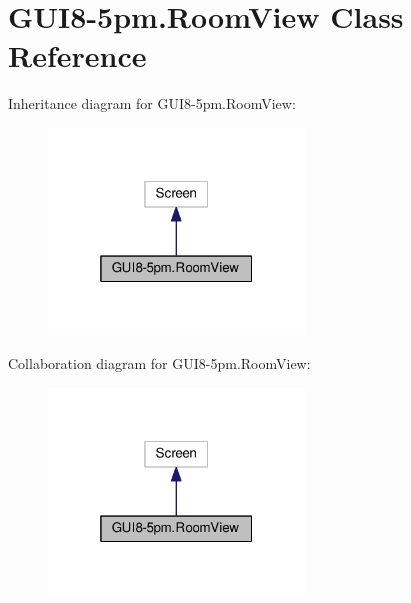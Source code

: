 \hypertarget{classGUI8-5pm_1_1RoomView}{}\section{G\+U\+I8-\/5pm.Room\+View Class Reference}
\label{classGUI8-5pm_1_1RoomView}


Inheritance diagram for G\+U\+I8-\/5pm.Room\+View\+:\nopagebreak
\begin{figure}[H]
\begin{center}
\leavevmode
\includegraphics[width=193pt]{classGUI8-5pm_1_1RoomView__inherit__graph}
\end{center}
\end{figure}


Collaboration diagram for G\+U\+I8-\/5pm.Room\+View\+:\nopagebreak
\begin{figure}[H]
\begin{center}
\leavevmode
\includegraphics[width=193pt]{classGUI8-5pm_1_1RoomView__coll__graph}
\end{center}
\end{figure}
